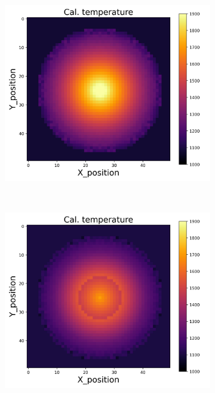 {\begin{figure}[p]
\begin{minipage}{\textwidth}
\begin{subfigure}{0.325\textwidth}
        \end{subfigure}
        \begin{subfigure}{0.325\textwidth}
            \centering
            \includegraphics[width=\textwidth]{figures/raw_data/24/mix/T_cal.jpg}
        \end{subfigure}
    \end{minipage}\\
    \begin{minipage}{\textwidth}
        \centering
        \begin{subfigure}{0.325\textwidth}
            \centering
            \includegraphics[width=\textwidth]{figures/raw_data/25/mix/T_cal.jpg}

\end{subfigure}
\end{minipage}
\end{figure}}
